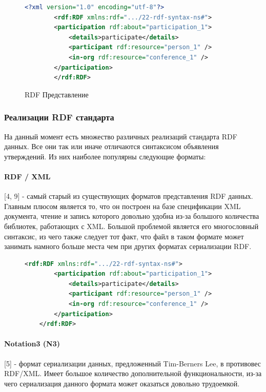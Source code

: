 \documentclass[12pt]{article}
\begin{document}
\pagebreak

\begin{figure}
    \begin{lstlisting}[language=XML]
        <?xml version="1.0" encoding="utf-8"?>
        <rdf:RDF xmlns:rdf=".../22-rdf-syntax-ns#">
        <participation rdf:about="participation_1">
            <details>participate</details>
            <participant rdf:resource="person_1" />
            <in-org rdf:resource="conference_1" />
        </participation>
        </rdf:RDF>
    \end{lstlisting}
    \caption{RDF Представление}
\end{figure}

\subsubsection{Реализации RDF стандарта}
\qquad На данный момент есть множество различных реализаций стандарта RDF данных. Все они так или иначе отличаются синтаксисом объявления утверждений. Из них наиболее популярны следующие форматы:\par

\paragraph{RDF / XML}[4, 9] - самый старый из существующих форматов представления RDF данных. Главным плюсом является то, что он построен на базе спецификации XML документа, чтение и запись которого довольно удобна из-за большого количества библиотек, работающих с XML.
Большой проблемой является его многословный синтаксис, из чего также следует тот факт,
что файл в таком формате может занимать намного больше места чем при других форматах сериализации RDF.\par

\begin{figure}[!ht]
    \begin{lstlisting}[language=XML]
    <rdf:RDF xmlns:rdf=".../22-rdf-syntax-ns#"> 
        <participation rdf:about="participation_1">
            <details>participate</details>
            <participant rdf:resource="person_1" />
            <in-org rdf:resource="conference_1" />
        </participation>
    </rdf:RDF>
    \end{lstlisting}
\end{figure}

\pagebreak

\paragraph{Notation3 (N3)} [5] - формат сериализации данных, предложенный Tim-Berners Lee, в противовес RDF/XML. Имеет большое количество дополнительной функциональности, из-за чего сериализация данного формата может оказаться довольно трудоемкой.
\end{document}

